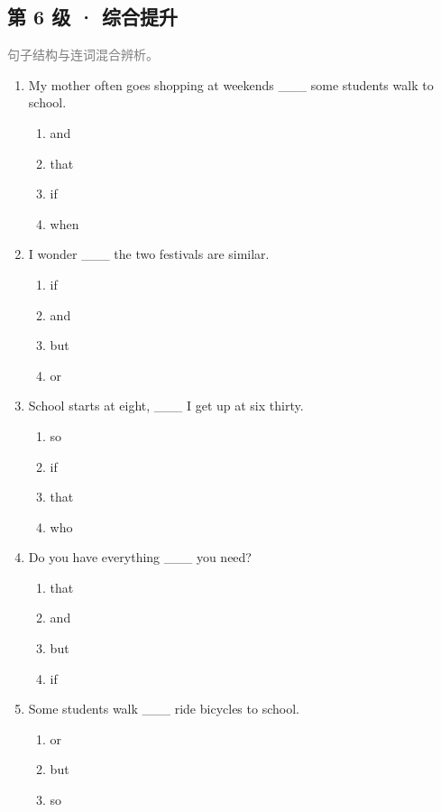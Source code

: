 \documentclass[11pt,a4paper]{ctexart}
\begin{document}
\subsection*{第 6 级 · 综合提升}
\noindent\textcolor{gray}{句子结构与连词混合辨析。}\par\smallskip
\begin{enumerate}[leftmargin=*,itemsep=4pt]
\item My mother often goes shopping at weekends \_\_\_ some students walk to school.
\begin{enumerate}[label=\Alph*.,leftmargin=2em,itemsep=1pt,topsep=2pt]
\item and
\item that
\item if
\item when
\end{enumerate}
\item I wonder \_\_\_ the two festivals are similar.
\begin{enumerate}[label=\Alph*.,leftmargin=2em,itemsep=1pt,topsep=2pt]
\item if
\item and
\item but
\item or
\end{enumerate}
\item School starts at eight, \_\_\_ I get up at six thirty.
\begin{enumerate}[label=\Alph*.,leftmargin=2em,itemsep=1pt,topsep=2pt]
\item so
\item if
\item that
\item who
\end{enumerate}
\item Do you have everything \_\_\_ you need?
\begin{enumerate}[label=\Alph*.,leftmargin=2em,itemsep=1pt,topsep=2pt]
\item that
\item and
\item but
\item if
\end{enumerate}
\item Some students walk \_\_\_ ride bicycles to school.
\begin{enumerate}[label=\Alph*.,leftmargin=2em,itemsep=1pt,topsep=2pt]
\item or
\item but
\item so

\end{enumerate}
\end{enumerate}
\end{document}
